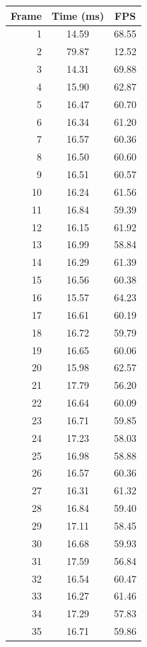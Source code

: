 \begin{table}[htbp]
  \centering\small
  \setlength{\tabcolsep}{8pt}
  \begin{tabular}{@{}rcc@{}}
    \toprule
    \textbf{Frame} & \textbf{Time (ms)} & \textbf{FPS} \\
    \midrule
    1 & 14.59 & 68.55 \\
    2 & 79.87 & 12.52 \\
    3 & 14.31 & 69.88 \\
    4 & 15.90 & 62.87 \\
    5 & 16.47 & 60.70 \\
    6 & 16.34 & 61.20 \\
    7 & 16.57 & 60.36 \\
    8 & 16.50 & 60.60 \\
    9 & 16.51 & 60.57 \\
    10 & 16.24 & 61.56 \\
    11 & 16.84 & 59.39 \\
    12 & 16.15 & 61.92 \\
    13 & 16.99 & 58.84 \\
    14 & 16.29 & 61.39 \\
    15 & 16.56 & 60.38 \\
    16 & 15.57 & 64.23 \\
    17 & 16.61 & 60.19 \\
    18 & 16.72 & 59.79 \\
    19 & 16.65 & 60.06 \\
    20 & 15.98 & 62.57 \\
    21 & 17.79 & 56.20 \\
    22 & 16.64 & 60.09 \\
    23 & 16.71 & 59.85 \\
    24 & 17.23 & 58.03 \\
    25 & 16.98 & 58.88 \\
    26 & 16.57 & 60.36 \\
    27 & 16.31 & 61.32 \\
    28 & 16.84 & 59.40 \\
    29 & 17.11 & 58.45 \\
    30 & 16.68 & 59.93 \\
    31 & 17.59 & 56.84 \\
    32 & 16.54 & 60.47 \\
    33 & 16.27 & 61.46 \\
    34 & 17.29 & 57.83 \\
    35 & 16.71 & 59.86 \\

\end{tabular}
\end{table}
